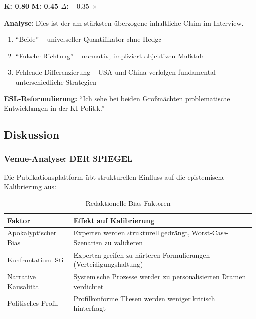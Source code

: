 \begin{tcolorbox}[colback=red!5!white,colframe=red!50!black,title=Claim 10: USA und China gehen beide in die falsche Richtung bei KI]
\textbf{K: 0.80 \quad M: 0.45 \quad $\Delta$: $+0.35$ \quad $\times$}

\textbf{Analyse:} Dies ist der am st\"arksten \"uberzogene inhaltliche Claim im Interview.
\begin{enumerate}
    \item ``Beide'' -- universeller Quantifikator ohne Hedge
    \item ``Falsche Richtung'' -- normativ, impliziert objektiven Ma{\ss}stab
    \item Fehlende Differenzierung -- USA und China verfolgen fundamental unterschiedliche Strategien
\end{enumerate}

\textbf{ESL-Reformulierung:} ``Ich sehe bei beiden Gro{\ss}m\"achten problematische Entwicklungen in der KI-Politik.''
\end{tcolorbox}


\subsection{Diskussion}

\subsubsection{Venue-Analyse: DER SPIEGEL}

Die Publikationsplattform \"ubt strukturellen Einfluss auf die epistemische Kalibrierung aus:

\begin{table}[H]
\centering
\caption{Redaktionelle Bias-Faktoren}
\small
\begin{tabular}{lp{9cm}}
\toprule
\textbf{Faktor} & \textbf{Effekt auf Kalibrierung} \\
\midrule
Apokalyptischer Bias & Experten werden strukturell gedr\"angt, Worst-Case-Szenarien zu validieren \\
Konfrontations-Stil & Experten greifen zu h\"arteren Formulierungen (Verteidigungshaltung) \\
Narrative Kausalit\"at & Systemische Prozesse werden zu personalisierten Dramen verdichtet \\
Politisches Profil & Profilkonforme Thesen werden weniger kritisch hinterfragt \\
\bottomrule
\end{tabular}
\end{table}


